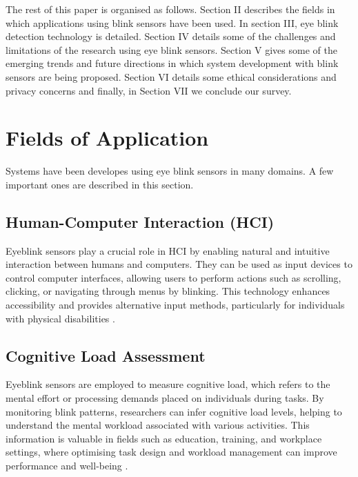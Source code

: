 \documentclass[conference]{IEEEtran}
\begin{document}
The rest of this paper is organised as follows.
 Section II describes the fields in which applications using blink sensors have been used. In section III, eye blink detection technology is detailed. Section IV details some of  the challenges and limitations of the research using eye blink sensors. Section V gives some of the emerging trends and future directions in which system development with blink sensors are being proposed. Section VI details some ethical considerations and privacy concerns and finally, in Section VII we conclude our survey.


\section{Fields of Application}
Systems have been developes using eye blink sensors in many domains. A few important ones are described in this section.

\subsection{Human-Computer Interaction (HCI)}
Eyeblink sensors play a crucial role in HCI by enabling natural and intuitive interaction between humans and computers. They can be used as input devices to control computer interfaces, allowing users to perform actions such as scrolling, clicking, or navigating through menus by blinking. This technology enhances accessibility and provides alternative input methods, particularly for individuals with physical disabilities  \cite{hci}.

\subsection{Cognitive Load Assessment}
Eyeblink sensors are employed to measure cognitive load, which refers to the mental effort or processing demands placed on individuals during tasks. By monitoring blink patterns, researchers can infer cognitive load levels, helping to understand the mental workload associated with various activities. This information is valuable in fields such as education, training, and workplace settings, where optimising task design and workload management can improve performance and well-being \cite{blink rate from postural behaviour}.
\end{document}
